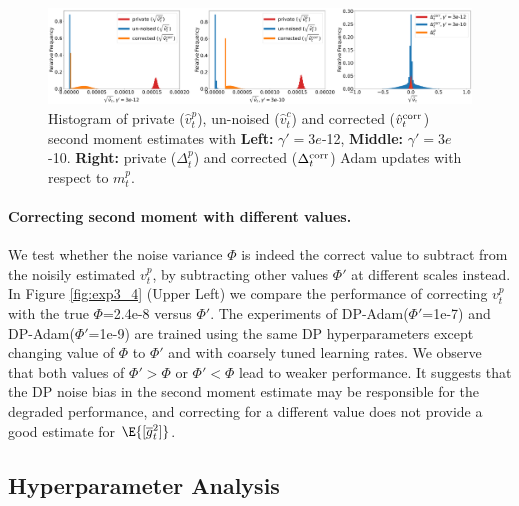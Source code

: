 \documentclass[letterpaper]{article} %
\begin{document}
\begin{figure}[t]
\centering
\includegraphics[width=0.95\linewidth]{figs/type1_hist_corr_new.pdf}
\caption{Histogram of private ($\hat{v}_t^p$), un-noised ($\hat{v}_t^c$) and corrected ($\hat{v}_t^{\textnormal{corr}}$) second moment estimates with \textbf{Left: } $\gamma'=3e$-12, \textbf{Middle: }$\gamma'=3e$-10. \textbf{Right: } private ($\Delta_t^p$) and corrected ($\Delta_t^{\textnormal{corr}}$) Adam updates with respect to $m_t^{p}$.
}
\label{fig:mt_vt_hist}
\end{figure}

\paragraph{Correcting second moment with different values.}
We test whether the noise variance $\Phi$ is indeed the correct value to subtract from the noisily estimated $v_t^{p}$, by subtracting other values $\Phi'$ at different scales instead. In Figure \ref{fig:exp3_4} (Upper Left) we compare the performance of correcting $v_t^{p}$ with the true $\Phi$=2.4e-8 versus $\Phi'$. The experiments of DP-Adam($\Phi'$=1e-7) and DP-Adam($\Phi'$=1e-9) are trained using the same DP hyperparameters except changing value of $\Phi$ to $\Phi'$ and with coarsely tuned learning rates. We observe that both values of $\Phi'>\Phi$ or $\Phi'<\Phi$ lead to weaker performance. It suggests that the DP noise bias in the second moment estimate may be responsible for the degraded performance, and correcting for a different value does not provide a good estimate for $\E{[\overline{g}^2_t]}$.

\subsection{Hyperparameter Analysis}
\end{document}
